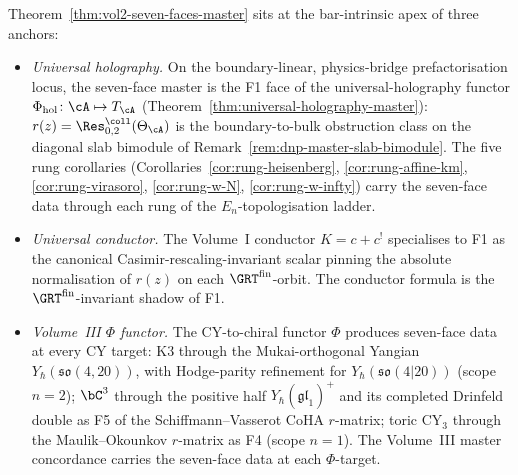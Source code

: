\begin{remark}
\label{rem:dnp-master-climax-anchors}
Theorem~\ref{thm:vol2-seven-faces-master} sits at the
bar-intrinsic apex of three anchors:
\begin{itemize}
\item[(a)] \emph{Universal holography.} On the boundary-linear,
 physics-bridge prefactorisation locus, the seven-face master is
 the F1 face of the universal-holography functor
 $\Phi_{\mathrm{hol}}\colon \cA \mapsto T_{\cA}$
 (Theorem~\ref{thm:universal-holography-master}):
 $r(z) = \Res^{\coll}_{0,2}(\Theta_{\cA})$ is the boundary-to-bulk
 obstruction class on the diagonal slab bimodule of
 Remark~\ref{rem:dnp-master-slab-bimodule}. The five rung
 corollaries (Corollaries~\ref{cor:rung-heisenberg},
 \ref{cor:rung-affine-km}, \ref{cor:rung-virasoro},
 \ref{cor:rung-w-N}, \ref{cor:rung-w-infty}) carry the seven-face
 data through each rung of the $E_n$-topologisation ladder.
\item[(b)] \emph{Universal conductor.} The Volume~I conductor
 $K = c + c^{!}$ specialises to F1 as the canonical
 Casimir-rescaling-invariant scalar pinning the absolute
 normalisation of $r(z)$ on each $\GRT^{\mathrm{fin}}$-orbit. The
 conductor formula is the $\GRT^{\mathrm{fin}}$-invariant shadow
 of F1.
\item[(c)] \emph{Volume~III $\Phi$ functor.} The CY-to-chiral
 functor $\Phi$ produces seven-face data at every CY target: K3
 through the Mukai-orthogonal Yangian
 $Y_{\hbar}(\mathfrak{so}(4,20))$, with Hodge-parity refinement
 for $Y_{\hbar}(\mathfrak{so}(4|20))$ (scope $n=2$);
	$\bC^{3}$ through the positive half
	$Y_\hbar(\widehat{\mathfrak{gl}}_1)^+$ and its completed
	Drinfeld double as F5 of the Schiffmann--Vasserot CoHA
	$r$-matrix; toric CY${}_{3}$ through
 the Maulik--Okounkov $r$-matrix as F4 (scope $n=1$). The
 Volume~III master concordance carries the seven-face data at
 each $\Phi$-target.
\end{itemize}
\end{remark}
